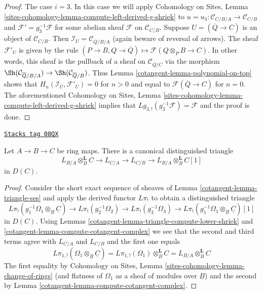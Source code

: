 \begin{proof}
\medskip\noindent
The case $i = 3$. In this case we will apply
Cohomology on Sites, Lemma
\ref{sites-cohomology-lemma-compute-left-derived-g-shriek}
to $u = u_3 : \mathcal{C}_{C/B/A} \to \mathcal{C}_{C/B}$
and $\mathcal{F}' = g_3^{-1}\mathcal{F}$ for some abelian sheaf
$\mathcal{F}$ on $\mathcal{C}_{C/B}$.
Suppose $U = (\overline{Q} \to C)$ is an object of $\mathcal{C}_{C/B}$.
Then $\mathcal{I}_U = \mathcal{C}_{\overline{Q}/B/A}$ (again beware
of reversal of arrows). The sheaf $\mathcal{F}'_U$ is given by the
rule $(P \to B, Q \to \overline{Q}) \mapsto \mathcal{F}(Q \otimes_P B \to C)$.
In other words, this sheaf is the pullback of a sheaf
on $\mathcal{C}_{\overline{Q}/C}$ via the morphism
$\Sh(\mathcal{C}_{\overline{Q}/B/A}) \to \Sh(\mathcal{C}_{\overline{Q}/B})$.
Thus Lemma \ref{cotangent-lemma-polynomial-on-top} shows that
$H_n(\mathcal{I}_U, \mathcal{F}'_U) = 0$ for $n > 0$
and equal to $\mathcal{F}(\overline{Q} \to C)$ for $n = 0$.
The aforementioned Cohomology on Sites, Lemma
\ref{sites-cohomology-lemma-compute-left-derived-g-shriek}
implies that $Lg_{3, !}(g_3^{-1}\mathcal{F}) = \mathcal{F}$ and
the proof is done.
\end{proof}

\begin{proposition}[Triangle]
\label{cotangent-proposition-triangle}
\href{https://stacks.math.columbia.edu/tag/08QX}{\texttt{Stacks tag 08QX}}

Let $A \to B \to C$ be ring maps. There is a canonical distinguished
triangle
$$
L_{B/A} \otimes_B^\mathbf{L} C \to L_{C/A} \to L_{C/B} \to
L_{B/A} \otimes_B^\mathbf{L} C[1]
$$
in $D(C)$.
\end{proposition}

\begin{proof}

Consider the short exact sequence of sheaves of
Lemma \ref{cotangent-lemma-triangle-ses}
and apply the derived functor $L\pi_!$ to obtain a distinguished
triangle
$$
L\pi_!(g_1^{-1}\Omega_1 \otimes_{\underline{B}} \underline{C}) \to
L\pi_!(g_2^{-1}\Omega_2) \to
L\pi_!(g_3^{-1}\Omega_3) \to
L\pi_!(g_1^{-1}\Omega_1 \otimes_{\underline{B}} \underline{C})[1]
$$
in $D(C)$. Using Lemmas \ref{cotangent-lemma-triangle-compute-lower-shriek} and
\ref{cotangent-lemma-compute-cotangent-complex}
we see that the second and third terms agree with $L_{C/A}$ and $L_{C/B}$
and the first one equals
$$
L\pi_{1, !}(\Omega_1 \otimes_{\underline{B}} \underline{C}) =
L\pi_{1, !}(\Omega_1) \otimes_B^\mathbf{L} C =
L_{B/A} \otimes_B^\mathbf{L} C
$$
The first equality by Cohomology on Sites, Lemma
\ref{sites-cohomology-lemma-change-of-rings}
(and flatness of $\Omega_1$ as a sheaf of modules over $\underline{B}$)
and the second by Lemma \ref{cotangent-lemma-compute-cotangent-complex}.
\end{proof}

